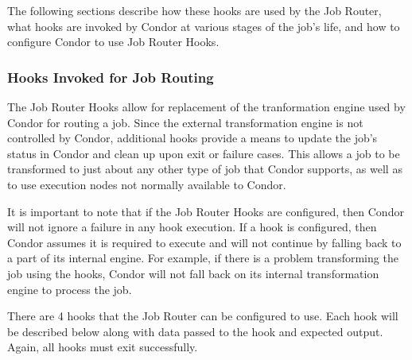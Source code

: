 The following sections describe how these hooks are used by the Job Router,
what hooks are invoked by Condor at various stages of the job's life, 
and how to configure Condor to use Job Router Hooks.

\subsubsection{\label{sec:job-hooks-JR}
Hooks Invoked for Job Routing}

The Job Router Hooks allow for replacement of the tranformation engine used
by Condor for routing a job.
Since the external transformation engine is not controlled by Condor,
additional hooks provide a means to update the job's
status in Condor and clean up upon exit or failure cases.
This allows a job to be transformed to just about any other type of job
that Condor supports,
as well as to use execution nodes not normally available to Condor.

It is important to note that if the Job Router Hooks are configured, 
then Condor will not ignore a failure in any hook execution.
If a hook is configured,
then Condor assumes it is required to execute and will not
continue by falling back to a part of its internal engine.
For example,
if there is a problem transforming the job using the hooks,
Condor will not fall back on its internal transformation engine 
to process the job.

There are 4 hooks that the Job Router can be configured to use.
Each hook will be described below along with data passed 
to the hook and expected output.
Again, all hooks must exit successfully.

